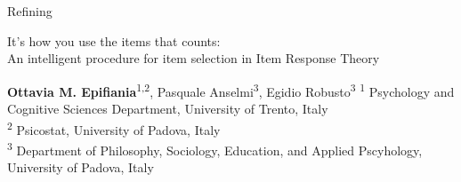 \documentclass{beamer}
\begin{document}
\begin{frame}{Refining}
	
	\begin{center}
		\begin{Large}
				It's how you use the items that counts: \\ An intelligent procedure for item selection in Item Response Theory
		\end{Large}

		
		\small
		\vspace{5mm}
	\textbf{Ottavia M. Epifiania}\textsuperscript{1,2}, Pasquale Anselmi\textsuperscript{3}, Egidio Robusto\textsuperscript{3}
		\small
		\vspace{3mm}
\textsuperscript{1} Psychology and Cognitive Sciences Department, University of Trento, Italy \\
\textsuperscript{2} Psicostat, University of Padova, Italy \\
\textsuperscript{3} Department of Philosophy, Sociology, Education, and Applied Pscyhology,	University of Padova, Italy
		
	\end{center}

\end{frame}
\end{document}
